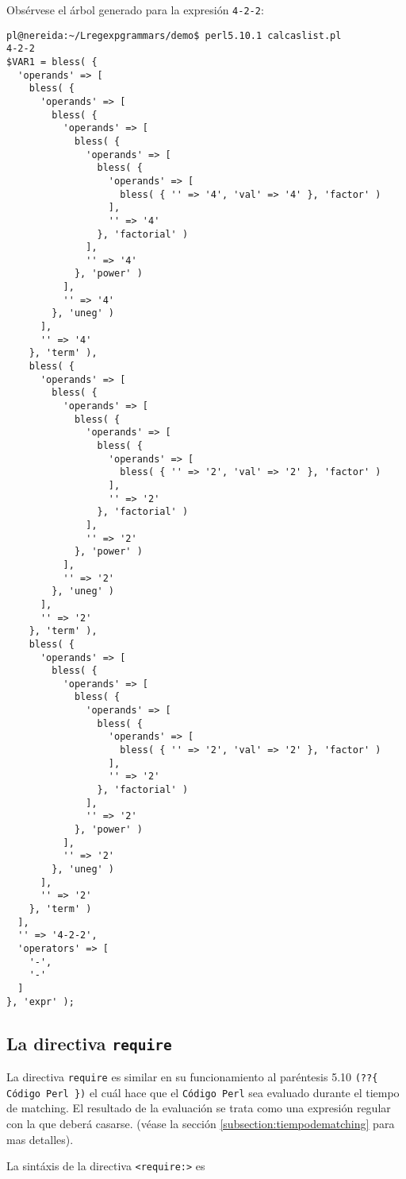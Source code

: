 Obsérvese el árbol generado para la expresión \verb|4-2-2|:
\begin{verbatim}
pl@nereida:~/Lregexpgrammars/demo$ perl5.10.1 calcaslist.pl
4-2-2
$VAR1 = bless( {
  'operands' => [
    bless( {
      'operands' => [
        bless( {
          'operands' => [
            bless( {
              'operands' => [
                bless( {
                  'operands' => [
                    bless( { '' => '4', 'val' => '4' }, 'factor' )
                  ],
                  '' => '4'
                }, 'factorial' )
              ],
              '' => '4'
            }, 'power' )
          ],
          '' => '4'
        }, 'uneg' )
      ],
      '' => '4'
    }, 'term' ),
    bless( {
      'operands' => [
        bless( {
          'operands' => [
            bless( {
              'operands' => [
                bless( {
                  'operands' => [
                    bless( { '' => '2', 'val' => '2' }, 'factor' )
                  ],
                  '' => '2'
                }, 'factorial' )
              ],
              '' => '2'
            }, 'power' )
          ],
          '' => '2'
        }, 'uneg' )
      ],
      '' => '2'
    }, 'term' ),
    bless( {
      'operands' => [
        bless( {
          'operands' => [
            bless( {
              'operands' => [
                bless( {
                  'operands' => [
                    bless( { '' => '2', 'val' => '2' }, 'factor' )
                  ],
                  '' => '2'
                }, 'factorial' )
              ],
              '' => '2'
            }, 'power' )
          ],
          '' => '2'
        }, 'uneg' )
      ],
      '' => '2'
    }, 'term' )
  ],
  '' => '4-2-2',
  'operators' => [
    '-',
    '-'
  ]
}, 'expr' );
\end{verbatim}

\subsection{La directiva {\tt require}}

La directiva \verb|require| es similar 
en su funcionamiento al paréntesis 5.10 \verb|(??{ Código Perl })|
el cuál hace que el \verb|Código Perl| sea evaluado durante el tiempo de matching.
El resultado de la evaluación se trata como una expresión regular con la que deberá
casarse.
(véase la sección \ref{subsection:tiempodematching}
para mas detalles).

La sintáxis de la directiva \verb|<require:>| es


